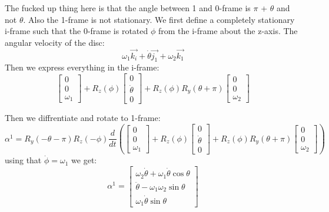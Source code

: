 The fucked up thing here is that the angle between 1 and 0-frame is $\pi$ + $\theta$ and not $\theta$. Also the 1-frame is not stationary. We first define a completely stationary i-frame such that the 0-frame is rotated $\phi$ from the i-frame about the z-axis.
The angular velocity of the disc:
\begin{equation}
    \omega_1\vec{k_i} + \dot{\theta}\vec{j_1} + \omega_2 \vec{k_1}
\end{equation}
Then we express everything in the i-frame:
\begin{equation}
    \begin{bmatrix}
        0 \\
        0\\
        \omega_1
    \end{bmatrix}
    +
    R_z(\phi)
    \begin{bmatrix}
        0 \\
        \dot{\theta}\\
        0
    \end{bmatrix}
    +
    R_z(\phi)R_y(\theta+\pi)
    \begin{bmatrix}
        0 \\
        0\\
        \omega_2
    \end{bmatrix}
\end{equation}

Then we diffrentiate and rotate to 1-frame:
\begin{equation}
\alpha^1 =
    R_y(-\theta-\pi)
    R_z(-\phi)
    \frac{d}{dt}
    \left(
    \begin{bmatrix}
        0 \\
        0\\
        \omega_1
    \end{bmatrix}
    +
    R_z(\phi)
    \begin{bmatrix}
        0 \\
        \dot{\theta}\\
        0
    \end{bmatrix}
    +
    R_z(\phi)R_y(\theta+\pi)
    \begin{bmatrix}
        0 \\
        0\\
        \omega_2
    \end{bmatrix}
    \right)
\end{equation}
using that $\dot{\phi} = \omega_1$ we get:
\begin{equation}
    \alpha^1 =
    \begin{bmatrix}
        \omega_2\dot{\theta}+\omega_1\dot{\theta}\cos\theta \\
        \ddot{\theta} - \omega_1\omega_2\sin\theta \\
        \omega_1\dot{\theta}\sin{\theta}
    \end{bmatrix}
\end{equation}



